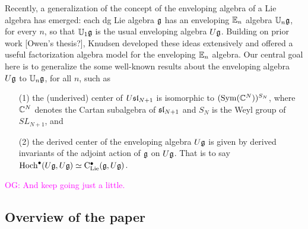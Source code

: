 \documentclass[11pt]{amsart}
\numberwithin{equation}{section}
\def\owen{\textcolor{magenta}{OG: }\textcolor{magenta}}
\begin{document}
Recently, a generalization of the concept of the enveloping algebra of a Lie algebra has emerged: 
each dg Lie algebra $\fg$ has an enveloping $\EE_n$ algebra $\UU_n\fg$, for every $n$, 
so that $\UU_1\fg$ is the usual enveloping algebra $U\fg$. 
Building on prior work \cite{BD, AF} [Owen's thesis?], 
Knudsen \cite{Knudsen} developed these ideas extensively and offered a useful factorization algebra model for the enveloping $\EE_n$ algebra. 
Our central goal here is to generalize the some well-known results about the enveloping algebra $U\fg$ to $\UU_n\fg$, for all $n$, such as
\begin{enumerate}
\item[(1)] the (underived) center of $U\sl_{N+1}$ is isomorphic to $(\Sym(\CC^{N}))^{S_N}$, where $\CC^{N}$ denotes the Cartan subalgebra of $\sl_{N+1}$ and $S_N$ is the Weyl group of $SL_{N+1}$, and
\item[(2)] the derived center of the enveloping algebra $U\fg$ is given by derived invariants of the adjoint action of $\fg$ on $U\fg$. That is to say $\Hoch^\bu(U\fg,U\fg) \simeq \clies(\fg, U\fg)$.
\end{enumerate}
\owen{And keep going just a little.}
%
%
%

\subsection{Overview of the paper}
\end{document}
